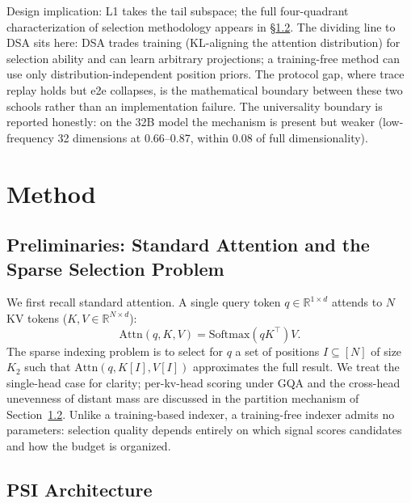 \documentclass[11pt]{article}
\begin{document}
Design implication: L1 takes the tail subspace; the full four-quadrant characterization of selection methodology appears in \S\ref{sec:l2}. The dividing line to DSA sits here: DSA trades training (KL-aligning the attention distribution) for selection ability and can learn arbitrary projections; a training-free method can use only distribution-independent position priors. The protocol gap, where trace replay holds but e2e collapses, is the mathematical boundary between these two schools rather than an implementation failure. The universality boundary is reported honestly: on the 32B model the mechanism is present but weaker (low-frequency 32 dimensions at 0.66--0.87, within 0.08 of full dimensionality).

\section{Method}

\subsection{Preliminaries: Standard Attention and the Sparse Selection Problem}

We first recall standard attention. A single query token $q\in\mathbb{R}^{1\times d}$ attends to $N$ KV tokens ($K,V\in\mathbb{R}^{N\times d}$):
\begin{equation}
\mathrm{Attn}(q, K, V) = \mathrm{Softmax}\!\left(qK^\top\right)V.
\end{equation}
The sparse indexing problem is to select for $q$ a set of positions $I\subseteq[N]$ of size $K_2$ such that $\mathrm{Attn}(q, K[I], V[I])$ approximates the full result. We treat the single-head case for clarity; per-kv-head scoring under GQA and the cross-head unevenness of distant mass are discussed in the partition mechanism of Section~\ref{sec:l2}. Unlike a training-based indexer, a training-free indexer admits no parameters: selection quality depends entirely on which signal scores candidates and how the budget is organized.

\subsection{PSI Architecture}\label{sec:l2}
\end{document}
